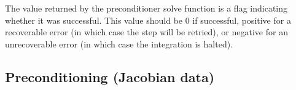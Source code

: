 {
  The value returned by the preconditioner solve function is a flag
  indicating whether it was successful.  This value should be $0$ if successful,
  positive for a recoverable error (in which case the step will be retried), or
  negative for an unrecoverable error (in which case the integration is halted).
}
{}

\subsection{Preconditioning (Jacobian data)}\label{ss:precondFn}

